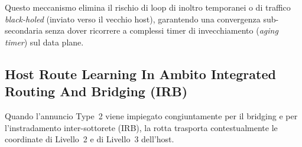 \documentclass[11pt, a4paper]{article}
\begin{document}
Questo meccanismo elimina il rischio di loop di inoltro temporanei o di traffico \emph{black-holed} (inviato verso il vecchio host), garantendo una convergenza sub-secondaria senza dover ricorrere a complessi timer di invecchiamento (\emph{aging timer}) sul data plane.

\subsection{Host Route Learning In Ambito Integrated Routing And Bridging (IRB)}

Quando l'annuncio Type~2 viene impiegato congiuntamente per il bridging e per l'instradamento inter-sottorete (IRB), la rotta trasporta contestualmente le coordinate di Livello~2 e di Livello~3 dell'host.

\end{document}
